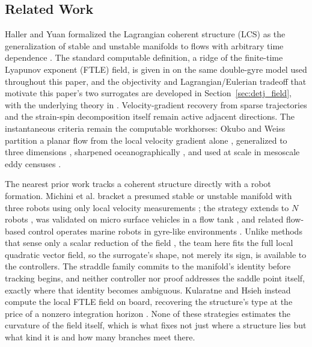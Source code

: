 \documentclass[lettersize,journal]{IEEEtran}
\begin{document}
\subsection{Related Work}
\label{sec:related_robots}

Haller and Yuan formalized the Lagrangian coherent structure (LCS) as
the generalization of stable and unstable manifolds to flows with
arbitrary time dependence \cite{6}. The standard computable definition,
a ridge of the finite-time Lyapunov exponent (FTLE) field, is given in
\cite{8} on the same double-gyre model used throughout this paper, and
the objectivity and Lagrangian/Eulerian tradeoff that motivate this
paper's two surrogates are developed in Section~\ref{sec:detj_field},
with the underlying theory in \cite{16,17,18}. Velocity-gradient
recovery from sparse trajectories \cite{19} and the strain-spin
decomposition itself \cite{20} remain active adjacent directions. The
instantaneous criteria remain the computable workhorses: Okubo and Weiss
partition a planar flow from the local velocity gradient alone
\cite{21,22}, generalized to three dimensions \cite{23}, sharpened
oceanographically \cite{24}, and used at scale in mesoscale eddy censuses
\cite{5}.

The nearest prior work tracks a coherent structure directly with a
robot formation. Michini et al. bracket a presumed stable or unstable
manifold with three robots using only local velocity measurements
\cite{9}; the strategy extends to $N$ robots \cite{10}, was validated
on micro surface vehicles in a flow tank \cite{11}, and related
flow-based control operates marine robots in gyre-like environments
\cite{12}. Unlike methods that sense only a scalar reduction of the
field \cite{25}, the team here fits the full local quadratic vector
field, so the surrogate's shape, not merely its sign, is available to
the controllers. The straddle family commits to the manifold's identity
before tracking begins, and neither controller nor proof addresses the
saddle point itself, exactly where that identity becomes ambiguous.
Kularatne and Hsieh instead compute the local FTLE field on board,
recovering the structure's type at the price of a nonzero integration
horizon \cite{13}. None of these strategies estimates the curvature of
the field itself, which is what fixes not just where a structure lies
but what kind it is and how many branches meet there.
\end{document}

